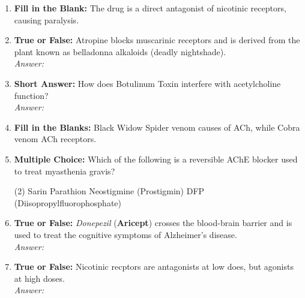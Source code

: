 \begin{enumerate}[label=\textbf{Q3.4.\arabic*}]
    \item \textbf{Fill in the Blank:} The drug \underline{\hspace{3cm}} is a direct antagonist of nicotinic receptors, causing paralysis.

    

    \item \textbf{True or False:} Atropine blocks muscarinic receptors and is derived from the plant known as belladonna alkaloids (deadly nightshade). \\
        \textit{Answer:} %

    \item \textbf{Short Answer:} How does Botulinum Toxin interfere with acetylcholine function? \\
        \textit{Answer:} %

    \item \textbf{Fill in the Blanks:} Black Widow Spider venom causes \underline{\hspace{3cm}} of ACh, while Cobra venom \underline{\hspace{3cm}} ACh receptors.

    \item \textbf{Multiple Choice:} Which of the following is a reversible AChE blocker used to treat myasthenia gravis?
        \begin{tasks}[label=\textcolor{\documentTheme}{(\Alph*)}, item-format=\color{\documentTheme}, label-width=1.5em, item-indent=1.7em](2)
            \task Sarin
            \task Parathion
            \task Neostigmine (Prostigmin)
            \task DFP (Diisopropylfluorophosphate)
        \end{tasks}

    \item \textbf{True or False:} \textit{Donepezil} (\textbf{Aricept}) crosses the blood-brain barrier and is used to treat the cognitive symptoms of Alzheimer's disease. \\
        \textit{Answer:} %

    \item \textbf{True or False:} Nicotinic recptors are antagonists at low does, but agonists at high doses. \\
        \textit{Answer:} %


\end{enumerate}
